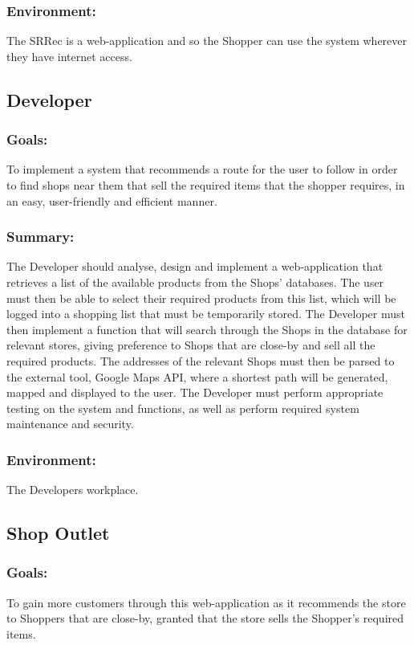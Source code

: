 \documentclass[12pt]{article}
\begin{document}
\subsubsection{Environment:}
The SRRec is a web-application and so the Shopper can use the system wherever they have internet
access.
\subsection{Developer}
\subsubsection{Goals:}
To implement a system that recommends a route for the user to follow in order to find shops near them that sell the required items that the shopper requires, in an easy, user-friendly and efficient manner.
\subsubsection{Summary:}
The Developer should analyse, design and implement a web-application that retrieves a list of the
available products from the Shops’ databases. The user must then be able to select their required
products from this list, which will be logged into a shopping list that must be temporarily stored. The
Developer must then implement a function that will search through the Shops in the database for
relevant stores, giving preference to Shops that are close-by and sell all the required products. The
addresses of the relevant Shops must then be parsed to the external tool, Google Maps API, where a
shortest path will be generated, mapped and displayed to the user. The Developer must perform
appropriate testing on the system and functions, as well as perform required system maintenance
and security.
\subsubsection{Environment:}
The Developers workplace.
\subsection{Shop Outlet}
\subsubsection{Goals:}
To gain more customers through this web-application as it recommends the store to Shoppers that
are close-by, granted that the store sells the Shopper’s required items.
\end{document}
